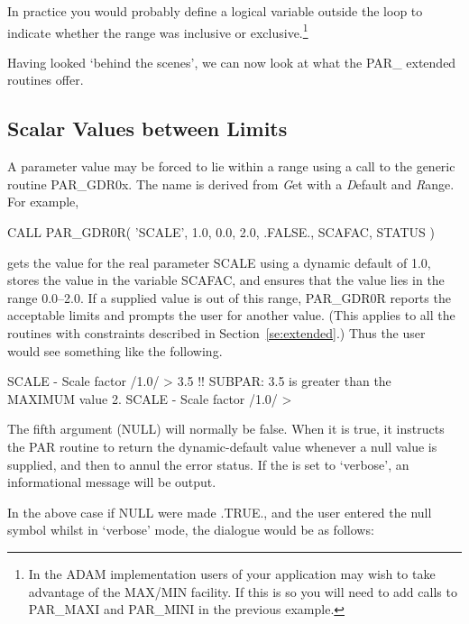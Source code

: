 \documentclass[twoside,11pt,nolof]{starlink}
\providecommand{\dash}{--}
\begin{document}
In practice you would probably define a logical variable outside the loop
to indicate whether the range was inclusive or exclusive.\footnote{In
the ADAM implementation users of your application may wish to take
advantage of the MAX/MIN facility.  If this is so you will need to add
calls to PAR\_MAXI and PAR\_MINI in the previous example.}

Having looked `behind the scenes', we can now look at what the PAR\_ extended
routines offer.

\subsection{Scalar Values between Limits}
\label{se:range}

A parameter value may be forced to lie within a range using a call to
the generic routine PAR\_GDR0x.  The name is derived from \emph{G\/}et
with a \emph{D\/}efault and \emph{R\/}ange.  For example,

\begin{terminalv}
      CALL PAR_GDR0R( 'SCALE', 1.0, 0.0, 2.0, .FALSE., SCAFAC, STATUS )
\end{terminalv}

gets the value for the real parameter SCALE using a dynamic default of
1.0, stores the value in the variable SCAFAC, and ensures that the value
lies in the range 0.0\dash2.0.  If a supplied value is out of this range,
PAR\_GDR0R reports the acceptable limits and prompts the user for
another value. (This applies to all the routines with constraints
described in Section~\ref{se:extended}.)  Thus the user would see
something like the following.

\begin{terminalv}
SCALE - Scale factor /1.0/ > 3.5
!! SUBPAR: 3.5 is greater than the MAXIMUM value 2.
SCALE - Scale factor /1.0/ >
\end{terminalv}

The fifth argument (NULL) will normally be false.  When it is true, it
instructs the PAR routine to return the dynamic-default value whenever a
null value is supplied, and then to annul the error status. If the
 is set to `verbose', an informational message will be
output.

In the above case if NULL were made .TRUE., and the user entered the null
symbol whilst in `verbose' mode, the dialogue would be as follows:
\end{document}
